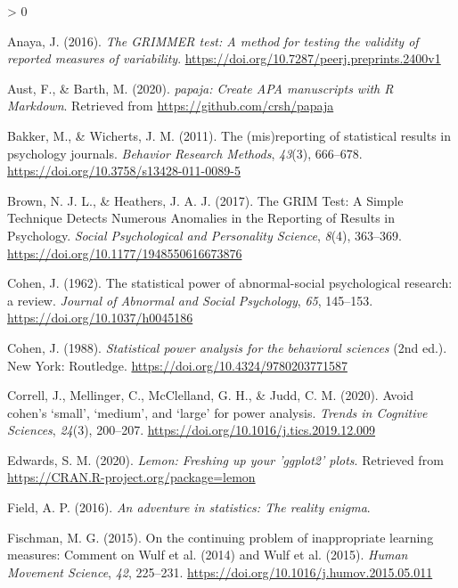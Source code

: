 \documentclass[
  english,
  man,floatsintext]{apa7}
\newlength{\cslhangindent}
\newenvironment{CSLReferences}[2] %
 {%
  \setlength{\parindent}{0pt}
  \ifodd #1 \everypar{\setlength{\hangindent}{\cslhangindent}}\ignorespaces\fi
  \ifnum #2 > 0
  \setlength{\parskip}{#2\baselineskip}
  \fi
 }%
 {}
\begin{document}
\hypertarget{refs}{}
\begin{CSLReferences}{1}{0}
\leavevmode\hypertarget{ref-anaya2016}{}%
Anaya, J. (2016). \emph{The GRIMMER test: A method for testing the validity of reported measures of variability}. \url{https://doi.org/10.7287/peerj.preprints.2400v1}

\leavevmode\hypertarget{ref-R-papaja}{}%
Aust, F., \& Barth, M. (2020). \emph{{papaja}: {Create} {APA} manuscripts with {R Markdown}}. Retrieved from \url{https://github.com/crsh/papaja}

\leavevmode\hypertarget{ref-bakker2011}{}%
Bakker, M., \& Wicherts, J. M. (2011). The (mis)reporting of statistical results in psychology journals. \emph{Behavior Research Methods}, \emph{43}(3), 666--678. \url{https://doi.org/10.3758/s13428-011-0089-5}

\leavevmode\hypertarget{ref-brown2017}{}%
Brown, N. J. L., \& Heathers, J. A. J. (2017). The GRIM Test: A Simple Technique Detects Numerous Anomalies in the Reporting of Results in Psychology. \emph{Social Psychological and Personality Science}, \emph{8}(4), 363--369. \url{https://doi.org/10.1177/1948550616673876}

\leavevmode\hypertarget{ref-cohen1962}{}%
Cohen, J. (1962). The statistical power of abnormal-social psychological research: a review. \emph{Journal of Abnormal and Social Psychology}, \emph{65}, 145--153. \url{https://doi.org/10.1037/h0045186}

\leavevmode\hypertarget{ref-cohen1988}{}%
Cohen, J. (1988). \emph{Statistical power analysis for the behavioral sciences} (2nd ed.). New York: Routledge. \url{https://doi.org/10.4324/9780203771587}

\leavevmode\hypertarget{ref-correll2020}{}%
Correll, J., Mellinger, C., McClelland, G. H., \& Judd, C. M. (2020). Avoid cohen{'}s {`}small{'}, {`}medium{'}, and {`}large{'} for power analysis. \emph{Trends in Cognitive Sciences}, \emph{24}(3), 200--207. \url{https://doi.org/10.1016/j.tics.2019.12.009}

\leavevmode\hypertarget{ref-R-lemon}{}%
Edwards, S. M. (2020). \emph{Lemon: Freshing up your 'ggplot2' plots}. Retrieved from \url{https://CRAN.R-project.org/package=lemon}

\leavevmode\hypertarget{ref-field2016}{}%
Field, A. P. (2016). \emph{An adventure in statistics: The reality enigma}.

\leavevmode\hypertarget{ref-fischman2015}{}%
Fischman, M. G. (2015). On the continuing problem of inappropriate learning measures: Comment on Wulf et al. (2014) and Wulf et al. (2015). \emph{Human Movement Science}, \emph{42}, 225--231. \url{https://doi.org/10.1016/j.humov.2015.05.011}


\end{CSLReferences}
\end{document}
